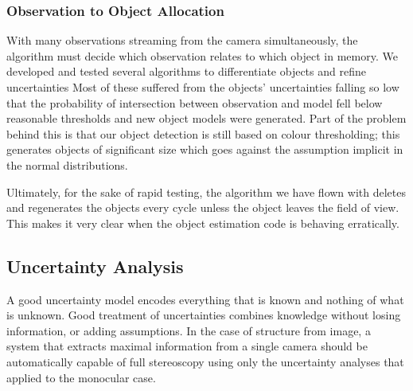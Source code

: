 \documentclass[a4paper, 11pt, titlepage]{article}
\begin{document}
    \subsubsection{Observation to Object Allocation}
      \label{sec:objectAllocation}
      With many observations streaming from the camera simultaneously, the algorithm must decide which observation relates to which object in memory.  We developed and tested several algorithms to differentiate objects and refine uncertainties
      Most of these suffered from the objects' uncertainties falling so low that the probability of intersection between observation and model fell below reasonable thresholds and new object models were generated.  Part of the problem behind this is that our object detection is still based on colour thresholding; this generates objects of significant size which goes against the assumption implicit in the normal distributions.

      Ultimately, for the sake of rapid testing, the algorithm we have flown with deletes and regenerates the objects every cycle unless the object leaves the field of view.  This makes it very clear when the object estimation code is behaving erratically.

  \subsection{Uncertainty Analysis}
    A good uncertainty model encodes everything that is known and nothing of what is unknown.  Good treatment of uncertainties combines knowledge without losing information, or adding assumptions.
    In the case of structure from image, a system that extracts maximal information from a single camera should be automatically capable of full stereoscopy using only the uncertainty analyses that applied to the monocular case.
\end{document}
